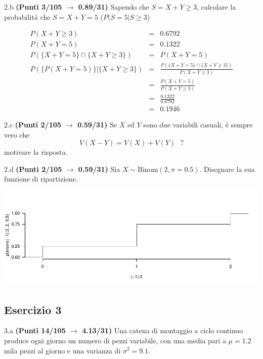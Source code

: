 \documentclass[
  11pt,
]{book}
\theoremstyle{mytheoremstyle}
\theoremstyle{mydefstyle}
\newenvironment{sol}
  {
  \begin{tcolorbox}[enhanced,breakable,arc=0.1mm,boxrule=1pt,colback=white,colframe=iblue,
  title=\bf \fontfamily{lmss}\selectfont \hspace{.5 cm} Soluzione,drop fuzzy shadow]

}{
\end{tcolorbox}
  }
\begin{document}
2.b \textbf{(Punti 3/105 \(\rightarrow\) 0.89/31)} Sapendo che \(S=X+Y\ge 3\), calcolare la probabilità che \(S=X+Y= 5\) (\(P(S=5|S\ge 3\))

\begin{sol}
\begin{eqnarray*}
  P(X+Y\ge 3) &=& 0.6792\\
  P(X+Y=5)    &=& 0.1322\\
  P(\{X+Y=5\}\cap\{X+Y\ge 3\}) &=&P(X+Y=5)\\
  P(\{P(X+Y=5)\}|\{X+Y\ge 3\}) &=&\frac{P(\{X+Y=5\}\cap\{X+Y\ge 3\})}{P(X+Y\ge 3)}\\
  &=&\frac{P(X+Y=5)}{P(X+Y\ge 3)}\\
  &=&\frac{0.1322}{0.6792}\\
  &=&0.1946
\end{eqnarray*}

\end{sol}

2.c \textbf{(Punti 2/105 \(\rightarrow\) 0.59/31)} Se \(X\) ed \(Y\) sono due variabili casuali, è sempre vero che
\[
V(X-Y)=V(X)+V(Y)~~~?
\]
motivare la risposta.

2.d \textbf{(Punti 2/105 \(\rightarrow\) 0.59/31)} Sia \(X\sim\text{Binom}(2,\pi=0.5)\). Disegnare la sua funzione di ripartizione.

\begin{sol}

\begin{center}\includegraphics{Esami_passati_con_soluzioni_files/figure-latex/2023-187-1} \end{center}

\end{sol}

\subsection{Esercizio 3}\label{esercizio-3-27}

3.a \textbf{(Punti 14/105 \(\rightarrow\) 4.13/31)} Una catena di montaggio a ciclo continuo produce ogni giorno un numero di pezzi variabile, con una media pari a
\(\mu=1.2\) mila pezzi al giorno e una varianza di \(\sigma^2=9.1\).
\end{document}
